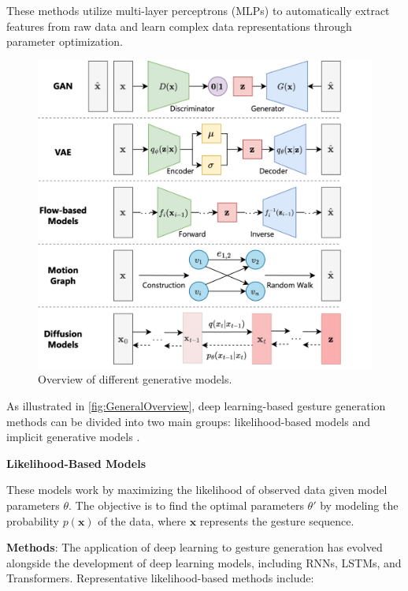 These methods utilize multi-layer perceptrons (MLPs) to automatically extract features from raw data and learn complex data representations through parameter optimization.

\begin{figure}[b]
	\centering
	\includegraphics[width=\linewidth]{images/GeneralOverview}
	\caption{Overview of different generative models.}
	\label{fig:GeneralOverview}
\end{figure}

As illustrated in \autoref{fig:GeneralOverview}, deep learning-based gesture generation methods can be divided into two main groups: likelihood-based models and implicit generative models \cite{song2021score}.


\textbf{Likelihood-Based Models}

These models work by maximizing the likelihood of observed data given model parameters $\theta$. The objective is to find the optimal parameters $\theta'$ by modeling the probability $p(\mathbf{x})$ of the data, where $\mathbf{x}$ represents the gesture sequence.


\textbf{Methods}: The application of deep learning to gesture generation has evolved alongside the development of deep learning models, including RNNs, LSTMs, and Transformers. Representative likelihood-based methods include:

